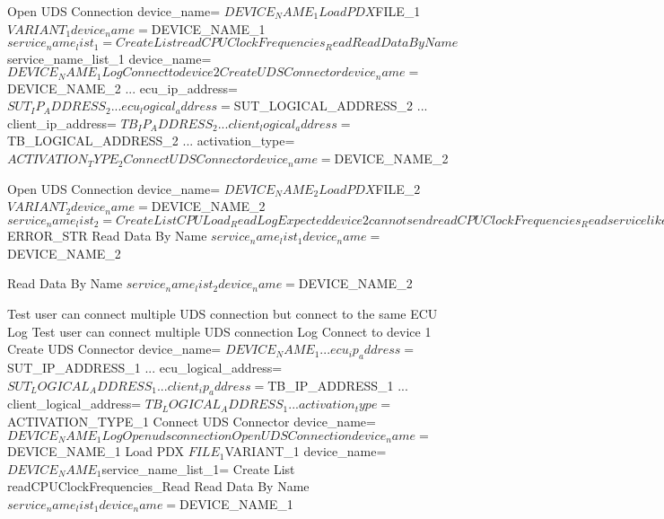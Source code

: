 \begin{robotcode}
    Open UDS Connection    device_name= ${DEVICE_NAME_1}
    Load PDX    ${FILE_1}    ${VARIANT_1}    device_name= ${DEVICE_NAME_1}
    ${service_name_list_1}=    Create List    readCPUClockFrequencies_Read
    Read Data By Name    ${service_name_list_1}    device_name= ${DEVICE_NAME_1}

    Log    Connect to device 2
    Create UDS Connector    device_name= ${DEVICE_NAME_2}
    ...                     ecu_ip_address= ${SUT_IP_ADDRESS_2}
    ...                     ecu_logical_address= ${SUT_LOGICAL_ADDRESS_2}
    ...                     client_ip_address= ${TB_IP_ADDRESS_2}
    ...                     client_logical_address= ${TB_LOGICAL_ADDRESS_2}
    ...                     activation_type= ${ACTIVATION_TYPE_2}
    Connect UDS Connector    device_name= ${DEVICE_NAME_2}

    Open UDS Connection    device_name= ${DEVICE_NAME_2}
    Load PDX    ${FILE_2}    ${VARIANT_2}    device_name= ${DEVICE_NAME_2}
    ${service_name_list_2}=    Create List    CPULoad_Read
    Log    Expected device 2 cannot send readCPUClockFrequencies_Read service like device 1
    Run Keyword And Expect Error    ${ERROR_STR}    Read Data By Name    ${service_name_list_1}    device_name= ${DEVICE_NAME_2}

    Read Data By Name    ${service_name_list_2}    device_name= ${DEVICE_NAME_2}

Test user can connect multiple UDS connection but connect to the same ECU
    Log    Test user can connect multiple UDS connection
    Log    Connect to device 1
    Create UDS Connector    device_name= ${DEVICE_NAME_1}
    ...                     ecu_ip_address= ${SUT_IP_ADDRESS_1}
    ...                     ecu_logical_address= ${SUT_LOGICAL_ADDRESS_1}
    ...                     client_ip_address= ${TB_IP_ADDRESS_1}
    ...                     client_logical_address= ${TB_LOGICAL_ADDRESS_1}
    ...                     activation_type= ${ACTIVATION_TYPE_1}
    Connect UDS Connector    device_name= ${DEVICE_NAME_1}

    Log    Open uds connection
    Open UDS Connection    device_name= ${DEVICE_NAME_1}
    Load PDX    ${FILE_1}    ${VARIANT_1}    device_name= ${DEVICE_NAME_1}
    ${service_name_list_1}=    Create List    readCPUClockFrequencies_Read
    Read Data By Name    ${service_name_list_1}    device_name= ${DEVICE_NAME_1}


\end{robotcode}
